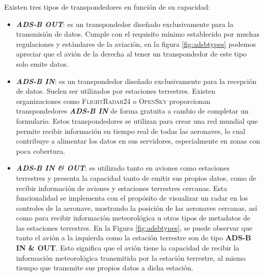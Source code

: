 \documentclass[a4paper, 11pt]{book}
\begin{document}
Existen tres tipos de transpondedores en función de su capacidad:
\begin{itemize}
	\item \textbf{\emph{ADS-B OUT}}: es un transpondedor diseñado exclusivamente para la transmisión de datos. Cumple con el requisito mínimo establecido por muchas regulaciones y estándares de la aviación, en la figura \ref{fig:adsbtypes} podemos apreciar que el avión de la derecha al tener un transpondedor de este tipo solo emite datos.
	\item \textbf{\emph{ADS-B IN}}: es un transpondedor diseñado exclusivamente para la recepción de datos. Suelen ser utilizados por estaciones terrestres. Existen organizaciones como \textsc{FlightRadar24} o \textsc{OpenSky} proporcionan transpondedores \textbf{\emph{ADS-B IN}} de forma gratuita a cambio de completar un formulario. Estos transpondedores se utilizan para crear una red mundial que permite recibir información en tiempo real de todas las aeronaves, lo cual contribuye a alimentar los datos en sus servidores, especialmente en zonas con poca cobertura.
	\item \textbf{\emph{ADS-B IN \& OUT}}: es utilizado tanto en aviones como estaciones terrestres y presenta la capacidad tanto de emitir sus propios datos, como de recibir información de aviones y estaciones terrestres cercanas. Esta funcionalidad se implementa con el propósito de visualizar un radar en los controles de la aeronave, mostrando la posición de las aeronaves cercanas, así como para recibir información meteorológica u otros tipos de metadatos de las estaciones terrestres. En la Figura \ref{fig:adsbtypes}, se puede observar que tanto el avión a la izquierda como la estación terrestre son de tipo \textbf{ADS-B IN \& OUT}. Esto significa que el avión tiene la capacidad de recibir la información meteorológica transmitida por la estación terrestre, al mismo tiempo que transmite sus propios datos a dicha estación.
\end{itemize}
\end{document}
